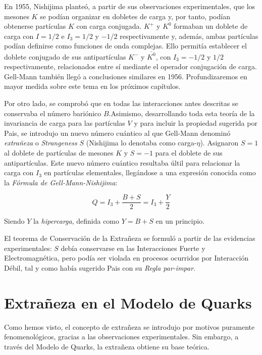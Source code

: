 En 1955, Nishijima planteó, a partir de sus observaciones experimentales, que los mesones $K$ se podían organizar en dobletes de carga y, por tanto, podían obtenerse partículas $K$ con carga conjugada. $K^+$ y $K^0$ formaban un doblete de carga con $I=1/2$ e $I_3=1/2$ y $-1/2$ respectivamente y, además, ambas partículas podían definirse como funciones de onda complejas. Ello permitía establecer el doblete conjugado de sus antipartículas $K^-$ y $\overline{K^0}$, con $I_3=-1/2$ y $1/2$ respectivamente, relacionados entre sí mediante el operador conjugación de carga. Gell-Mann también llegó a conclusiones similares en 1956. Profundizaremos en mayor medida sobre este tema en los próximos capítulos. \cite{Nishijima1955}

Por otro lado, se comprobó que en todas las interacciones antes descritas se conservaba el número bariónico $B$.\protect\footnotemark    Asimismo, desarrollando toda esta teoría de la invariancia de carga para las partículas $V$ y para incluir la propiedad sugerida por Pais, se introdujo un nuevo número cuántico al que Gell-Mann denominó \textit{extrañeza} o \textit{Strangeness} $S$ (Nishijima lo denotaba como carga-$\eta$). Asignaron $S=1$ al doblete de partículas de mesones $K$ y $S=-1$ para el doblete de sus antipartículas. Este nuevo número cuántico resultaba últil para relacionar la carga con $I_3$ en partículas elementales, llegándose a una expresión conocida como la \textit{Fórmula de Gell-Mann-Nishijima}:


\begin{equation}
Q=I_3+ \frac{B+S}{2}=I_3+\frac{Y}{2}
\end{equation}

Siendo $Y$ la \textit{hipercarga}, definida como $Y=B+S$ en un principio.

El teorema de Conservación de la Extrañeza se formuló a partir de las evidencias experimentales: $S$ debía conservarse en las Interacciones Fuerte y Electromagnética, pero podía ser violada en procesos ocurridos por Interacción Débil, tal y como había sugerido Pais con su \textit{Regla par-impar}.


\section{Extrañeza en el Modelo de Quarks}\label{cap:strangeness_quark_model}
\vspace{5mm}
Como hemos visto, el concepto de extrañeza se introdujo por motivos puramente fenomenológicos, gracias a las observaciones experimentales. Sin embargo, a través del Modelo de Quarks, la extrañeza obtiene su base teórica.

